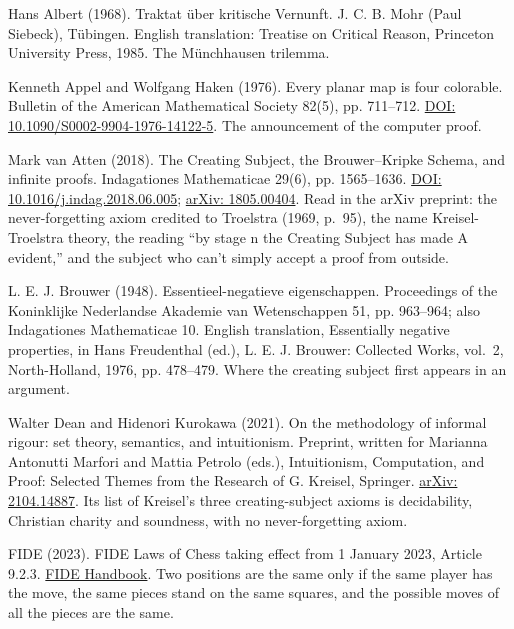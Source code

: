 \documentclass[11pt,twoside]{article}
\theoremstyle{thielethm}
\theoremstyle{thieledef}
\theoremstyle{thieledef}
\theoremstyle{thieledef}
\theoremstyle{thielethm}
\theoremstyle{thieleobs}
\theoremstyle{thielethm}
\begin{document}
\noindent Hans Albert (1968). Traktat \"uber kritische Vernunft. J. C. B. Mohr (Paul Siebeck), T\"ubingen. English translation: Treatise on Critical Reason, Princeton University Press, 1985. The M\"unchhausen trilemma.
\par\medskip

\noindent Kenneth Appel and Wolfgang Haken (1976). Every planar map is four colorable. Bulletin of the American Mathematical Society 82(5), pp. 711--712. \href{https://doi.org/10.1090/S0002-9904-1976-14122-5}{DOI: 10.1090/S0002-9904-1976-14122-5}. The announcement of the computer proof.
\par\medskip

\noindent Mark van Atten (2018). The Creating Subject, the Brouwer--Kripke Schema, and infinite proofs. Indagationes Mathematicae 29(6), pp. 1565--1636. \href{https://doi.org/10.1016/j.indag.2018.06.005}{DOI: 10.1016/j.indag.2018.06.005}; \href{https://arxiv.org/abs/1805.00404}{arXiv: 1805.00404}. Read in the arXiv preprint: the never-forgetting axiom credited to Troelstra (1969, p.~95), the name Kreisel-Troelstra theory, the reading ``by stage n the Creating Subject has made A evident,'' and the subject who can't simply accept a proof from outside.
\par\medskip

\noindent L. E. J. Brouwer (1948). Essentieel-negatieve eigenschappen. Proceedings of the Koninklijke Nederlandse Akademie van Wetenschappen 51, pp. 963--964; also Indagationes Mathematicae 10. English translation, Essentially negative properties, in Hans Freudenthal (ed.), L. E. J. Brouwer: Collected Works, vol.~2, North-Holland, 1976, pp. 478--479. Where the creating subject first appears in an argument.
\par\medskip

\noindent Walter Dean and Hidenori Kurokawa (2021). On the methodology of informal rigour: set theory, semantics, and intuitionism. Preprint, written for Marianna Antonutti Marfori and Mattia Petrolo (eds.), Intuitionism, Computation, and Proof: Selected Themes from the Research of G. Kreisel, Springer. \href{https://arxiv.org/abs/2104.14887}{arXiv: 2104.14887}. Its list of Kreisel's three creating-subject axioms is decidability, Christian charity and soundness, with no never-forgetting axiom.
\par\medskip

\noindent FIDE (2023). FIDE Laws of Chess taking effect from 1 January 2023, Article 9.2.3. \href{https://handbook.fide.com/chapter/E012023}{FIDE Handbook}. Two positions are the same only if the same player has the move, the same pieces stand on the same squares, and the possible moves of all the pieces are the same.
\par\medskip
\end{document}
